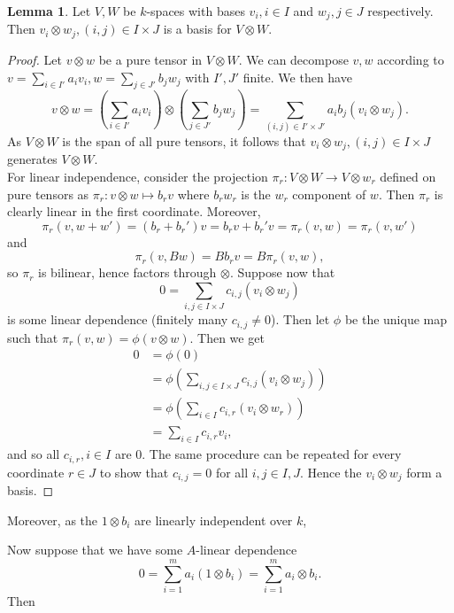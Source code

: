 \documentclass{article}
\theoremstyle{definition}
\newtheorem{lemma}[theorem]{Lemma}
\begin{document}
\begin{lemma}
	Let $V, W$ be $k$-spaces with bases $v_i, i \in I$ and $w_j, j \in J$
	respectively. Then $v_i \otimes w_j, (i, j) \in I \times J$ is a basis for
	$V \otimes W$.
\end{lemma}
\begin{proof}
	Let $v \otimes w$ be a pure tensor in $V \otimes W$. We can decompose $v,
	w$ according to $v = \sum_{i \in I'} a_i v_i, w = \sum_{j \in J'} b_j w_j$
	with $I', J'$ finite. We then have 
	\[
		v \otimes w 
		=
		\left(
			\sum_{i \in I'} a_i v_i
		\right)
		\otimes
		\left(
			\sum_{j \in J'} b_j w_j
		\right)
		=
		\sum_{(i, j) \in I' \times J'}
		a_i b_j 
		(v_i \otimes w_j).
	\] 
	As $V \otimes W$ is the span of all pure tensors, it follows that $v_i
	\otimes w_j, (i, j) \in I \times J$ generates $V \otimes W$. \\

	For linear independence, consider the projection $\pi_r : V \otimes W \to V
	\otimes w_r$ defined on pure tensors as $\pi_r : v \otimes w \mapsto b_r v$
	where $b_rw_r$ is the $w_r$ component of $w$. Then $\pi_r$ is clearly linear
	in the first coordinate. Moreover,
	\[
		\pi_r(v, w + w')
		=
		(b_r + b_r') v
		=
		b_r v + b_r' v
		=
		\pi_r(v, w)
		=
		\pi_r(v, w')
	\] 
	and
	\[
		\pi_r(v, B w)
		=
		B b_r v
		=
		B \pi_r(v, w),
	\] 
	so $\pi_r$ is bilinear, hence factors through $\otimes$.
	Suppose now that 
	\[
		0 = \sum_{i, j \in I \times J} c_{i, j} (v_i \otimes w_j)
	\] 
	is some linear dependence (finitely many $c_{i, j} \not = 0$). Then let $\phi$
	be the unique map such that $\pi_{r}(v, w) = \phi(v \otimes w)$. Then 
	we get 
	\begin{align*}
		0
		&=
		\phi(0) \\
		&=
		\phi\left(\sum_{i, j \in I \times J} c_{i, j} (v_i \otimes w_j)\right) \\
		&=
		\phi\left(\sum_{i \in I} c_{i, r} (v_i \otimes w_r)\right) \\
		&=
		\sum_{i \in I} c_{i, r} v_i,
	\end{align*} 
	and so all $c_{i, r}, i \in I$ are $0$. The same procedure can be repeated
	for every coordinate $r \in J$ to show that $c_{i, j} = 0$ for all $i, j
	\in I, J$. Hence the $v_i \otimes w_j$ form a basis.
\end{proof}


Moreover, as the $1 \otimes b_i$ are linearly independent over $k$,

Now suppose that we have some $A$-linear dependence
\[
	0 
	= 
	\sum_{i = 1}^{m} a_i (1 \otimes b_i)
	=
	\sum_{i = 1}^{m} a_i \otimes b_i.
\] 
Then
\end{document}

